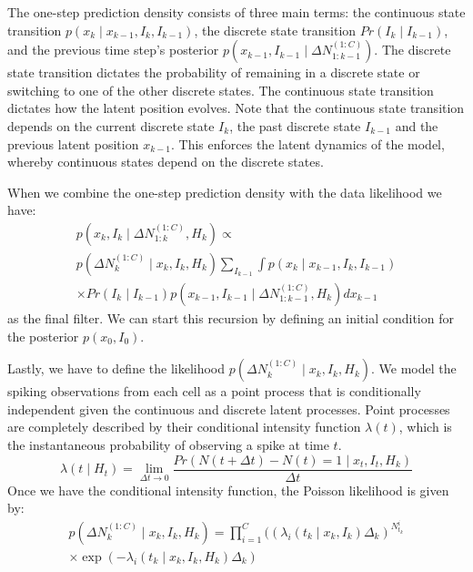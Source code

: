 \documentclass[conference]{IEEEtran}
\begin{document}
The one-step prediction density consists of three main terms: the continuous state transition $p(x_{k} \mid x_{k-1}, I_{k}, I_{k-1})$, the discrete state transition $Pr(I_{k} \mid I_{k-1})$, and the previous time step's posterior $p(x_{k-1}, I_{k-1} \mid \Delta N_{1:k-1}^{(1:C)})$. The discrete state transition dictates the probability of remaining in a discrete state or switching to one of the other discrete states. The continuous state transition dictates how the latent position evolves. Note that the continuous state transition depends on the current discrete state $I_{k}$, the past discrete state $I_{k-1}$ and the previous latent position $x_{k-1}$. This enforces the latent dynamics of the model, whereby continuous states depend on the discrete states.

When we combine the one-step prediction density with the data likelihood we have:
\begin{multline}
p(x_{k}, I_{k} \mid \Delta N_{1:k}^{(1:C)}, H_{k}) \propto \\
p(\Delta N_{k}^{(1:C)}  \mid x_{k}, I_{k}, H_{k}) \sum_{I_{k-1}} \int p(x_{k} \mid x_{k-1}, I_{k}, I_{k-1}) \\
\times Pr(I_{k} \mid I_{k-1}) p(x_{k-1}, I_{k-1} \mid \Delta N_{1:k-1}^{(1:C)}, H_{k}) dx_{k-1}
\end{multline}
as the final filter. We can start this recursion by defining an initial condition for the posterior $p(x_{0}, I_{0})$.

Lastly, we have to define the likelihood $p(\Delta N_{k}^{(1:C)} \mid x_{k}, I_{k}, H_{k})$. We model the spiking observations from each cell as a point process that is conditionally independent given the continuous and discrete latent processes. Point processes are completely described by their conditional intensity function $\lambda(t)$, which is the instantaneous probability of observing a spike at time $t$.
\begin{equation}
    \lambda(t \mid H_{t}) = \lim_{\Delta t \rightarrow{0}} \frac{Pr(N(t + \Delta t) - N(t) = 1 \mid x_{t}, I_{t}, H_{k})}{\Delta t}
\end{equation}
Once we have the conditional intensity function, the Poisson likelihood is given by:
\begin{multline}
    p(\Delta N_{k}^{(1:C)} \mid x_{k}, I_{k}, H_{k}) = \prod^{C}_{i=1} ((\lambda_{i}(t_{k} \mid x_{k}, I_{k})\Delta_{k})^{N_{t_{k}}^{i}} \\
    \times \exp(-\lambda_{i}(t_{k} \mid x_{k}, I_{k}, H_{k})\Delta_{k})
\end{multline}
\end{document}
